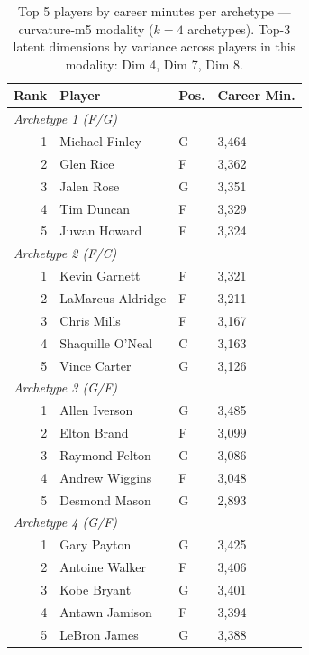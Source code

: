 \begin{table}[htbp]
  \centering\small
  \begin{tabular}{rlll}
    \toprule
    Rank & Player & Pos. & Career Min. \\
    \midrule
    \multicolumn{4}{l}{\textit{Archetype 1 (F/G)}} \\
    \midrule
    1 & Michael Finley & G & 3,464 \\
    2 & Glen Rice & F & 3,362 \\
    3 & Jalen Rose & G & 3,351 \\
    4 & Tim Duncan & F & 3,329 \\
    5 & Juwan Howard & F & 3,324 \\
    \midrule[0.4pt]
    \multicolumn{4}{l}{\textit{Archetype 2 (F/C)}} \\
    \midrule
    1 & Kevin Garnett & F & 3,321 \\
    2 & LaMarcus Aldridge & F & 3,211 \\
    3 & Chris Mills & F & 3,167 \\
    4 & Shaquille O'Neal & C & 3,163 \\
    5 & Vince Carter & G & 3,126 \\
    \midrule[0.4pt]
    \multicolumn{4}{l}{\textit{Archetype 3 (G/F)}} \\
    \midrule
    1 & Allen Iverson & G & 3,485 \\
    2 & Elton Brand & F & 3,099 \\
    3 & Raymond Felton & G & 3,086 \\
    4 & Andrew Wiggins & F & 3,048 \\
    5 & Desmond Mason & G & 2,893 \\
    \midrule[0.4pt]
    \multicolumn{4}{l}{\textit{Archetype 4 (G/F)}} \\
    \midrule
    1 & Gary Payton & G & 3,425 \\
    2 & Antoine Walker & F & 3,406 \\
    3 & Kobe Bryant & G & 3,401 \\
    4 & Antawn Jamison & F & 3,394 \\
    5 & LeBron James & G & 3,388 \\
    \bottomrule
  \end{tabular}
  \caption{Top 5 players by career minutes per archetype --- curvature-m5 modality ($k=4$ archetypes). Top-3 latent dimensions by variance across players in this modality: Dim 4, Dim 7, Dim 8.}
  \label{tab:arch_reps_curvature_m5}
\end{table}


